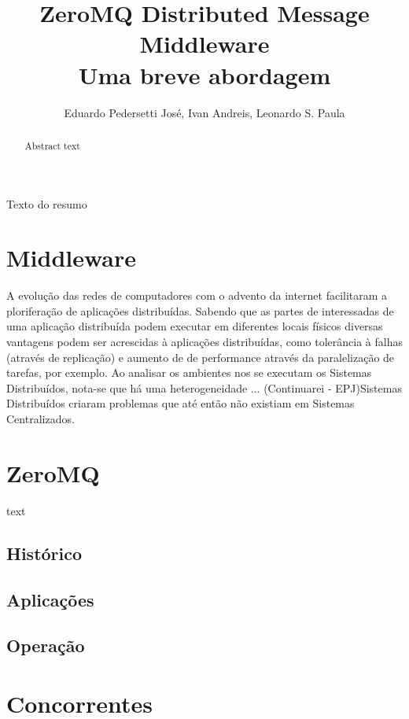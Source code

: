 \documentclass[12pt]{article}
\title{ZeroMQ Distributed Message Middleware\\Uma breve abordagem}
\author{Eduardo Pedersetti José\inst{1}, Ivan Andreis\inst{1}, Leonardo S. Paula\inst{1}}
\begin{document}
 

\maketitle

\begin{abstract}
  Abstract text
\end{abstract}
     
\begin{resumo} 
  Texto do resumo
\end{resumo}

\section{Middleware}

A evolução das redes de computadores com o advento da internet facilitaram a ploriferação 
de aplicações distribuídas. Sabendo que as partes de interessadas de uma aplicação distribuída
podem executar em diferentes locais físicos diversas vantagens podem ser acrescidas à aplicações
distribuídas, como tolerância à falhas (através de replicação) e aumento de de performance através
da paralelização de tarefas, por exemplo.
Ao analisar os ambientes nos se executam os Sistemas Distribuídos, nota-se que há uma heterogeneidade
...
(Continuarei - EPJ)Sistemas Distribuídos criaram problemas que até então não existiam em Sistemas Centralizados.

\section{ZeroMQ} \label{sec:firstpage}

text

\subsection{Histórico}
\subsection{Aplicações}
\subsection{Operação}

\section{Concorrentes}
\end{document}
